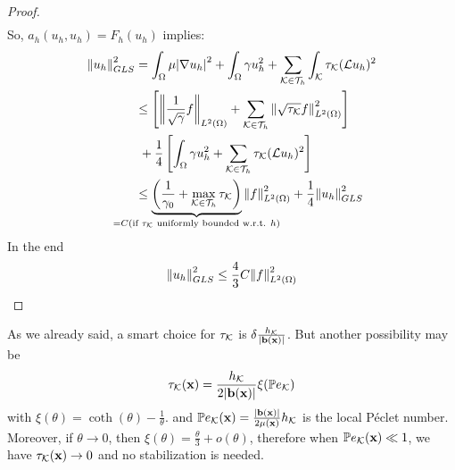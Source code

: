 \begin{proof}
\begin{equation*}
\begin{split}
        \end{split}
    \end{equation*}
    So, \(a_h(u_h, u_h) = F_h(u_h)\) implies:
    \begin{align*}
        \norm{u_h}_{GLS}^2 &= \int_\Omega \mu \abs{\grad u_h}^2 + \int_\Omega \gamma u_h^2 + \sum_{\element \in \triangulation} \int_\element \tau_\element (\mathcal{L}u_h)^2 \\
        &\leq \left[ \norm{\frac{1}{\sqrt{\gamma}}f}_{L^2(\Omega)} + \sum_{\element \in \triangulation} \norm{\sqrt{\tau_\element}f}_{L^2(\Omega)}^2 \right] \\
        & \ + \frac{1}{4} \left[ \int_\Omega \gamma u_h^2 + \sum_{\element \in \triangulation} \tau_\element (\mathcal{L}u_h)^2 \right] \\
        &\leq \underbrace{\left( \frac{1}{\gamma_0} +\max_{\element \in \triangulation} \tau_\element \right)}_{\mathclap{=C(\txt{if }\tau_\element \txt{ uniformly bounded w.r.t. }h)}} \ltwonorm{f}^2 +\frac{1}{4} \norm{u_h}_{GLS}^2
    \end{align*}
    In the end 
    \[
        \norm{u_h}_{GLS}^2 \leq \frac{4}{3} C \norm{f}_{L^2(\Omega)}^2
    \]
\end{proof}
As we already said, a smart choice for \(\tau_{\mathcal{K}}\) is \(\delta\frac{h_{\mathcal{K}}}{\abs{\textbf{b}(\textbf{x})}}\). But another possibility may be 
\[
    \tau_{\mathcal{K}}(\textbf{x}) = \frac{h_{\mathcal{K}}}{2\abs{\textbf{b}(\textbf{x})}} \xi(\mathbb{P}e_{\mathcal{K}})
\]
with \(\xi(\theta) = \coth(\theta)-\frac{1}{\theta}\). and \(\mathbb{P}e_{\mathcal{K}} (\textbf{x}) = \frac{\abs{\textbf{b}(\textbf{x})}}{2\mu(\textbf{x})}h_{\mathcal{K}}\) is the local Péclet number. 
Moreover, if \(\theta \to 0\), then \(\xi(\theta) = \frac{\theta}{3} + o(\theta)\), therefore when \(\mathbb{P}e_{\mathcal{K}}(\textbf{x}) \ll 1\), we have \(\tau_{\mathcal{K}}(\textbf{x}) \to 0\) and no stabilization is needed.
